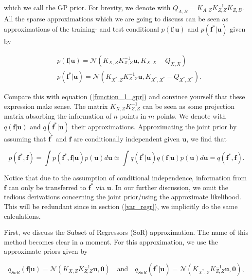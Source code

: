 \documentclass[12pt,a4paper,oneside]{book}
\begin{document}
which we call the GP prior. For brevity, we denote with $Q_{A,B} = K_{A,Z} K_{Z,Z}^{-1} K_{Z,B}$. All the sparse approximations which we are going to discuss can be seen as approximations of the training- and test conditional $p(\bm{f}|\bm{u})$ and $p(\bm{f}^{\ast}|\bm{u})$ given by 

\begin{equation}\label{sparse1}
\begin{aligned}
&p(\bm{f}|\bm{u}) = \mathcal{N}(K_{X,Z} K^{-1}_{Z,Z} \bm{u}, K_{X,X} - Q_{X,X}) \\
&p(\bm{f}^{\ast}|\bm{u}) = \mathcal{N}(K_{X^{\ast},Z} K^{-1}_{Z,Z} \bm{u}, K_{X^{\ast},X^{\ast}} - Q_{X^{\ast},X^{\ast}}). 
\end{aligned}
\end{equation}

Compare this with equation (\ref{function_1_gpr}) and convince yourself that these expression make sense. The matrix $K_{X,Z} K^{-1}_{Z,Z}$ can be seen as some projection matrix absorbing the information of $n$ points in $m$ points. We denote with $q(\bm{f}|\bm{u})$ and $q(\bm{f}^{\ast}|\bm{u})$ their approximations. Approximating the joint prior by assuming that $\bm{f}^{\ast}$ and $\bm{f}$ are conditionally independent given $\bm{u}$, we find that 

\begin{equation}
p(\bm{f}^{\ast},\bm{f}) = \int p( \bm{f}^{\ast},\bm{f} | \bm{u}) p (\bm{u}) d\bm{u}  \simeq  \int q(\bm{f}^{\ast}|\bm{u}) q(\bm{f}|\bm{u}) p(\bm{u}) d\bm{u} = q(\bm{f}^{\ast}, \bm{f}) .
\end{equation}

Notice that due to the assumption of conditional independence, information from $\bm{f}$ can only be transferred to $\bm{f}^{\ast}$ via $\bm{u}$. In our further discussion, we omit the tedious derivations concerning the joint prior/using the approximate likelihood. This will be redundant since in section (\ref{var_regr}), we implicitly do the same calculations.

First, we discuss the Subset of Regressors (SoR) approximation. The name of this method becomes clear in a moment. For this approximation, we use the approximate priors given by 

\begin{equation}
q_{SoR}(\bm{f}|\bm{u}) = \mathcal{N}(K_{X,Z} K^{-1}_{Z,Z} \bm{u} , \bm{0}) \quad \text{and} \quad q_{SoR}(\bm{f}^{\ast} | \bm{u}) =\mathcal{N}(K_{X^{\ast},Z} K^{-1}_{Z,Z} \bm{u} , \bm{0}),
\end{equation}
\end{document}
